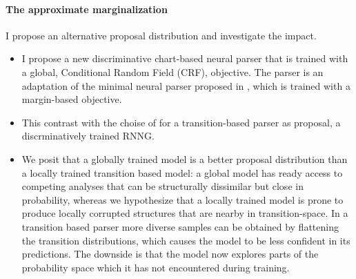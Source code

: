 \paragraph{The approximate marginalization} I propose an alternative proposal distribution and investigate the impact.
\begin{itemize}

  \item I propose a new discriminative chart-based neural parser that is trained with a global, Conditional Random Field (CRF), objective. The parser is an adaptation of the minimal neural parser proposed in \citet{stern2017minimal}, which is trained with a margin-based objective.

  \item This contrast with the choise of \citet{dyer2016rnng} for a transition-based parser as proposal, a discrminatively trained RNNG.

  \item We posit that a globally trained model is a better proposal distribution than a locally trained transition based model: a global model has ready access to competing analyses that can be structurally dissimilar but close in probability, whereas we hypothesize that a locally trained model is prone to produce locally corrupted structures that are nearby in transition-space. In a transition based parser more diverse samples can be obtained by flattening the transition distributions, which causes the model to be less confident in its predictions. The downside is that the model now explores parts of the probability space which it has not encountered during training.

\end{itemize}


